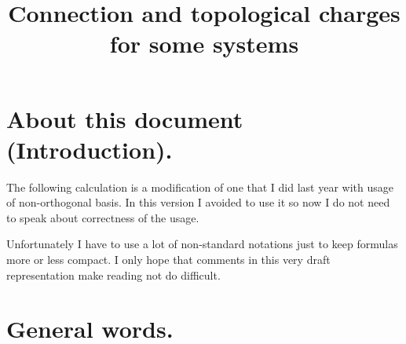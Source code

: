 


\def\MAP#1{\ifmmode{#1}\else{$#1$}\fi}

\def\abs#1{\MAP{\mid\!\!#1\!\!\mid}} 

\def\ket#1{\MAP{\mid\!\!#1\!\!>}}
\def\bra#1{\MAP{<\!\!#1\!\!\mid}}
\def\dirProd#1#2{\MAP{<\!\!#1\!\mid\!#2\!\!>}}

\def\pDer#1#2{\MAP{\frac{\partial #1}{\partial #2}}}
\def\pDerF#1#2{\MAP{\partial_#2 #1}}
\def\pDerB#1#2{\MAP{\left(#1\right)^\prime_#2}}
\def\oDer#1#2{\MAP{\frac{d#1}{d#2}}}
\def\oDerB#1#2{\MAP{left(#1\right)^\prime}}

\def\be{\[}
\def\ee{\]}
\def\bel#1{\begin{equation}\label{#1}} %
\def\eel{\end{equation}} %

\def\rf#1{(\ref{#1})}



\title{Connection and topological charges for some systems}


\section{About this document (Introduction).}

The following calculation is a modification of one that I did last year
with usage of non-orthogonal basis. In this version I avoided to use it 
so now I do not need to speak about correctness of the usage.

Unfortunately I have to use a lot of non-standard notations just to keep
formulas more or less compact. I only hope that comments in this very 
draft representation make reading not do difficult.     
 

\section{General words.}


